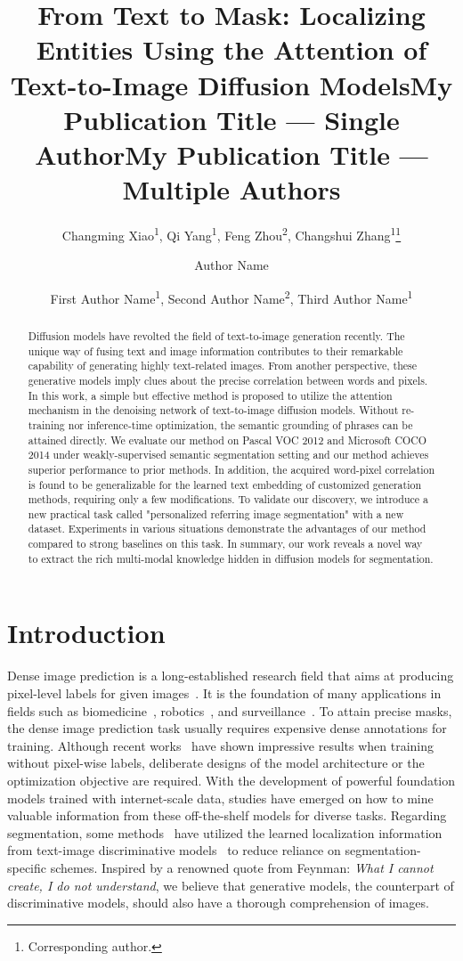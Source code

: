 \documentclass[letterpaper]{article} \usepackage[submission]{aaai24}  \usepackage{times}  \usepackage{helvet}  \usepackage{courier}  \usepackage[hyphens]{url}  \usepackage{graphicx} \urlstyle{rm} \def\UrlFont{\rm}  \usepackage{natbib}  \usepackage{caption} \frenchspacing  \setlength{\pdfpagewidth}{8.5in} \setlength{\pdfpageheight}{11in} \usepackage{algorithm}
\title{From Text to Mask: Localizing Entities Using the Attention of Text-to-Image Diffusion Models}
\author{
Changming Xiao\textsuperscript{\rm 1}\equalcontrib,
    Qi Yang\textsuperscript{\rm 1}\equalcontrib, 
    Feng Zhou\textsuperscript{\rm 2},
    Changshui Zhang\textsuperscript{\rm 1}\thanks{Corresponding author.}
}
\title{My Publication Title --- Single Author}
\author {
    Author Name
}
\title{My Publication Title --- Multiple Authors}
\author {
First Author Name\textsuperscript{\rm 1},
    Second Author Name\textsuperscript{\rm 2},
    Third Author Name\textsuperscript{\rm 1}
}
\begin{document}
\maketitle

\begin{abstract}
Diffusion models have revolted the field of text-to-image generation recently.
The unique way of fusing text and image information contributes to their remarkable capability of generating highly text-related images. 
From another perspective, these generative models imply clues about the precise correlation between words and pixels.
In this work, a simple but effective method is proposed to utilize the attention mechanism in the denoising network of text-to-image diffusion models.
Without re-training nor inference-time optimization, the semantic grounding of phrases can be attained directly.
We evaluate our method on Pascal VOC 2012 and Microsoft COCO 2014 under weakly-supervised semantic segmentation setting and our method achieves superior performance to prior methods.
In addition, the acquired word-pixel correlation is found to be generalizable for the learned text embedding of customized generation methods, requiring only a few modifications.
To validate our discovery, we introduce a new practical task called "personalized referring image segmentation" with a new dataset.
Experiments in various situations demonstrate the advantages of our method compared to strong baselines on this task.
In summary, our work reveals a novel way to extract the rich multi-modal knowledge hidden in diffusion models for segmentation.
\end{abstract}

\section{Introduction}
\label{sec:intro}

Dense image prediction is a long-established research field that aims at producing pixel-level labels for given images~\cite{FCN}. 
It is the foundation of many applications in fields such as biomedicine~\cite{unet}, robotics~\cite{affordancenet}, and surveillance~\cite{anomalydetect}.
To attain precise masks, the dense image prediction task usually requires expensive dense annotations for training. 
Although recent works~\cite{groupvit, clims} have shown impressive results when training without pixel-wise labels, deliberate designs of the model architecture or the optimization objective are required.
With the development of powerful foundation models trained with internet-scale data, studies have emerged on how to mine valuable information from these off-the-shelf models for diverse tasks.
Regarding segmentation, some methods~\cite{woanyseg, denseclip} have utilized the learned localization information from text-image discriminative models~\cite{clip} to reduce reliance on segmentation-specific schemes.
Inspired by a renowned quote from Feynman: \emph{What I cannot create, I do not understand}, we believe that generative models, the counterpart of discriminative models, should also have a thorough comprehension of images.
\end{document}
